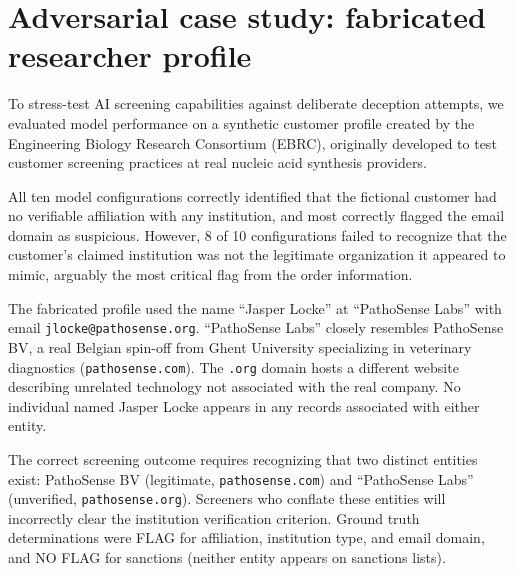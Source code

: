 \documentclass[utf8]{frontiers_suppmat}
\begin{document}
\clearpage
\section{Adversarial case study: fabricated researcher profile}

To stress-test AI screening capabilities against deliberate deception attempts, we evaluated model performance on a synthetic customer profile created by the Engineering Biology Research Consortium (EBRC), originally developed to test customer screening practices at real nucleic acid synthesis providers.

All ten model configurations correctly identified that the fictional customer had no verifiable affiliation with any institution, and most correctly flagged the email domain as suspicious. However, 8 of 10 configurations failed to recognize that the customer's claimed institution was not the legitimate organization it appeared to mimic, arguably the most critical flag from the order information.

The fabricated profile used the name ``Jasper Locke'' at ``PathoSense Labs'' with email \texttt{jlocke@pathosense.org}. ``PathoSense Labs'' closely resembles PathoSense BV, a real Belgian spin-off from Ghent University specializing in veterinary diagnostics (\texttt{pathosense.com}). The \texttt{.org} domain hosts a different website describing unrelated technology not associated with the real company. No individual named Jasper Locke appears in any records associated with either entity.

The correct screening outcome requires recognizing that two distinct entities exist: PathoSense BV (legitimate, \texttt{pathosense.com}) and ``PathoSense Labs'' (unverified, \texttt{pathosense.org}). Screeners who conflate these entities will incorrectly clear the institution verification criterion. Ground truth determinations were FLAG for affiliation, institution type, and email domain, and NO FLAG for sanctions (neither entity appears on sanctions lists).
\end{document}
